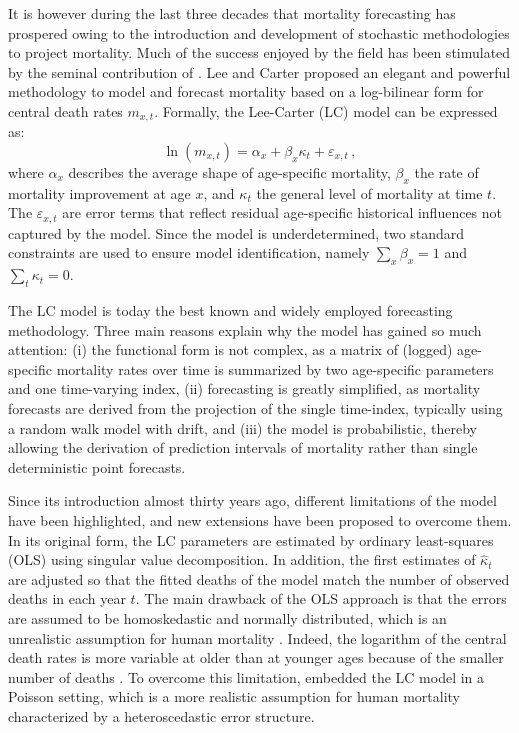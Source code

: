 \documentclass[Thesis]{subfiles}
\begin{document}
It is however during the last three decades that mortality forecasting has prospered owing to the introduction and development of stochastic methodologies to project mortality. Much of the success enjoyed by the field has been stimulated by the seminal contribution of \cite{lee1992modeling}. Lee and Carter proposed an elegant and powerful methodology to model and forecast mortality based on a log-bilinear form for central death rates $m_{x,t}$. Formally, the Lee-Carter (LC) model can be expressed as:
\begin{equation}\label{Eq:Ch1LC}
\ln \left( m_{x,t} \right) = \alpha_x + \beta_x \kappa_t + \varepsilon_{x,t} \,,
\end{equation}
where $\alpha_x$ describes the average shape of age-specific mortality, $\beta_x$ the rate of mortality improvement at age $x$, and $\kappa_t$ the general level of mortality at time $t$. The $\varepsilon_{x,t}$ are error terms that reflect residual age-specific historical influences not captured by the model. Since the model is underdetermined, two standard constraints are used to ensure model identification, namely $\sum_{x} \beta_x = 1$ and $\sum_{t} \kappa_t = 0$. 

The LC model is today the best known and widely employed forecasting methodology. Three main reasons explain why the model has gained so much attention: (i) the functional form is not complex, as a matrix of (logged) age-specific mortality rates over time is summarized by two age-specific parameters and one time-varying index, (ii) forecasting is greatly simplified, as  mortality forecasts are derived from the projection of the single time-index, typically using a random walk model with drift, and (iii) the model is probabilistic, thereby allowing the derivation of prediction intervals of mortality rather than single deterministic point forecasts. 

Since its introduction almost thirty years ago, different limitations of the model have been highlighted, and new extensions  have been proposed to overcome them. In its original form, the LC parameters are estimated by ordinary least-squares (OLS) using singular value decomposition. In addition, the first estimates of $\hat{\kappa}_t$ are adjusted so that the fitted deaths of the model match the number of observed deaths in each year $t$. The main drawback of the OLS approach is that the errors are assumed to be homoskedastic and normally distributed, which is an unrealistic assumption for human mortality \citep{alho2000discussion}. Indeed, the logarithm of the central death rates is more variable at older than at younger ages because of the smaller number of deaths \citep{brouhns2002poisson}. To overcome this limitation, \cite{brouhns2002poisson} embedded the LC model in a Poisson setting, which is a more realistic assumption for human mortality characterized by a heteroscedastic error structure.  
\end{document}
